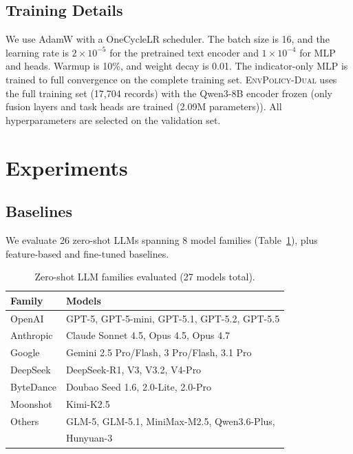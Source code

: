 \documentclass[11pt]{article}
\newcommand{\ours}{\textsc{EnvPolicy-Dual}}
\begin{document}
\subsection{Training Details}

We use AdamW with a OneCycleLR scheduler. The batch size is 16, and the learning rate is  $2\!\times\!10^{-5}$ for the pretrained text encoder and $1\!\times\!10^{-4}$ for MLP and heads. Warmup is 10\%, and weight decay is 0.01. The indicator-only MLP is trained to full convergence on the complete training set. \ours{} uses the
full training set (17{,}704 records) with the Qwen3-8B encoder frozen (only fusion layers and task heads are trained (2.09M parameters)). All hyperparameters are selected on the validation set.

\section{Experiments}
\label{sec:exp}

\subsection{Baselines}

We evaluate 26 zero-shot LLMs spanning 8 model families (Table~\ref{tab:models}),
plus feature-based and fine-tuned baselines.

\begin{table}[!t]
\centering\small
\setlength{\tabcolsep}{4pt}
\begin{tabular}{@{}ll@{}}
\toprule
\textbf{Family} & \textbf{Models} \\
\midrule
OpenAI      & GPT-5, GPT-5-mini, GPT-5.1, GPT-5.2, GPT-5.5 \\
Anthropic   & Claude Sonnet 4.5, Opus 4.5, Opus 4.7 \\
Google      & Gemini 2.5 Pro/Flash, 3 Pro/Flash, 3.1 Pro \\
DeepSeek    & DeepSeek-R1, V3, V3.2, V4-Pro \\
ByteDance   & Doubao Seed 1.6, 2.0-Lite, 2.0-Pro \\
Moonshot    & Kimi-K2.5 \\
Others      & GLM-5, GLM-5.1, MiniMax-M2.5, Qwen3.6-Plus, \\
            & Hunyuan-3 \\
\bottomrule
\end{tabular}
\caption{Zero-shot LLM families evaluated (27 models total).}
\label{tab:models}
\end{table}
\end{document}
